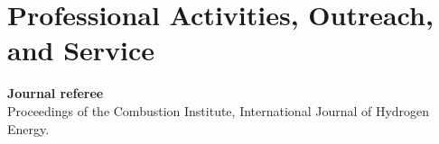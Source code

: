 \section{\sc Professional Activities, Outreach, and Service}

{\bf Journal referee}
\vspace*{.05in}\\
\hspace*{1em}
Proceedings of the Combustion Institute, International Journal of Hydrogen Energy.
